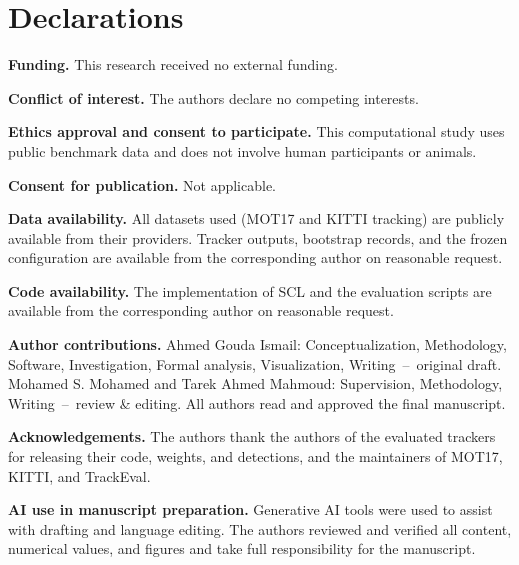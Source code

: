 \documentclass[pdflatex,sn-mathphys-num,iicol]{sn-jnl}
\newcommand{\scl}{SCL}
\begin{document}
\maketitle










\backmatter

\section*{Declarations}

\noindent\textbf{Funding.} This research received no external funding.

\noindent\textbf{Conflict of interest.} The authors declare no competing interests.

\noindent\textbf{Ethics approval and consent to participate.} This computational study uses public benchmark data and does not involve human participants or animals.

\noindent\textbf{Consent for publication.} Not applicable.

\noindent\textbf{Data availability.} All datasets used (MOT17 and KITTI tracking) are publicly available from their providers. Tracker outputs, bootstrap records, and the frozen configuration are available from the corresponding author on reasonable request.

\noindent\textbf{Code availability.} The implementation of \scl{} and the evaluation scripts are available from the corresponding author on reasonable request.

\noindent\textbf{Author contributions.} Ahmed Gouda Ismail: Conceptualization, Methodology, Software, Investigation, Formal analysis, Visualization, Writing~--~original draft. Mohamed S. Mohamed and Tarek Ahmed Mahmoud: Supervision, Methodology, Writing~--~review \& editing. All authors read and approved the final manuscript.

\noindent\textbf{Acknowledgements.} The authors thank the authors of the evaluated trackers for releasing their code, weights, and detections, and the maintainers of MOT17, KITTI, and TrackEval.

\noindent\textbf{AI use in manuscript preparation.} Generative AI tools were used to assist with drafting and language editing. The authors reviewed and verified all content, numerical values, and figures and take full responsibility for the manuscript.


\end{document}
